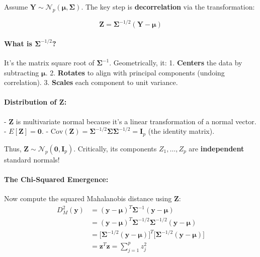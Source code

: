 \documentclass{article}
\begin{document}
Assume $\mathbf{Y} \sim \mathcal{N}_p(\boldsymbol{\mu}, \boldsymbol{\Sigma})$. The key step is \textbf{decorrelation} via the transformation:

\begin{equation}
    \mathbf{Z} = \boldsymbol{\Sigma}^{-1/2}(\mathbf{Y} - \boldsymbol{\mu})
\end{equation}

\paragraph{What is $\boldsymbol{\Sigma}^{-1/2}$?} It's the matrix square root of $\boldsymbol{\Sigma}^{-1}$. Geometrically, it:
1. \textbf{Centers} the data by subtracting $\boldsymbol{\mu}$.
2. \textbf{Rotates} to align with principal components (undoing correlation).
3. \textbf{Scales} each component to unit variance.

\paragraph{Distribution of $\mathbf{Z}$:}
- $\mathbf{Z}$ is multivariate normal because it's a linear transformation of a normal vector.
- $E[\mathbf{Z}] = \mathbf{0}$.
- $\text{Cov}(\mathbf{Z}) = \boldsymbol{\Sigma}^{-1/2} \boldsymbol{\Sigma} \boldsymbol{\Sigma}^{-1/2} = \mathbf{I}_p$ (the identity matrix).

Thus, $\mathbf{Z} \sim \mathcal{N}_p(\mathbf{0}, \mathbf{I}_p)$. Critically, its components $Z_1, \dots, Z_p$ are \textbf{independent} standard normals!

\paragraph{The Chi-Squared Emergence:}
Now compute the squared Mahalanobis distance using $\mathbf{Z}$:
\begin{align*}
    D_M^2(\mathbf{y}) &= (\mathbf{y} - \boldsymbol{\mu})^T \boldsymbol{\Sigma}^{-1} (\mathbf{y} - \boldsymbol{\mu}) \\
    &= (\mathbf{y} - \boldsymbol{\mu})^T \boldsymbol{\Sigma}^{-1/2}\boldsymbol{\Sigma}^{-1/2} (\mathbf{y} - \boldsymbol{\mu}) \\
    &= \big[\boldsymbol{\Sigma}^{-1/2}(\mathbf{y} - \boldsymbol{\mu})\big]^T \big[\boldsymbol{\Sigma}^{-1/2}(\mathbf{y} - \boldsymbol{\mu})\big] \\
    &= \mathbf{z}^T\mathbf{z} = \sum_{j=1}^p z_j^2
\end{align*}
\end{document}
